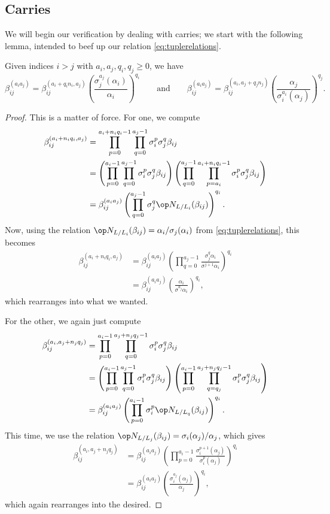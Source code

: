 \documentclass{article}
\numberwithin{equation}{section}
\begin{document}
\subsection{Carries}
We will begin our verification by dealing with carries; we start with the following lemma, intended to beef up our relation \autoref{eq:tuplerelations}.
\begin{lemma}
	Given indices $i>j$ with $a_i,a_j,q_i,q_j\ge0$, we have
	\[\beta_{ij}^{(a_ia_j)}=\beta_{ij}^{(a_i+q_in_i,a_j)}\left(\frac{\sigma_j^{a_j}(\alpha_i)}{\alpha_i}\right)^{q_i}\qquad\text{and}\qquad\beta_{ij}^{(a_ia_j)}=\beta_{ij}^{(a_i,a_j+q_jn_j)}\left(\frac{\alpha_j}{\sigma_i^{a_i}(\alpha_j)}\right)^{q_j}.\]
\end{lemma}
\begin{proof}
	This is a matter of force. For one, we compute
	\begin{align*}
		\beta_{ij}^{(a_i+n_iq_i,a_j)} &= \prod_{p=0}^{a_i+n_iq_i-1}\prod_{q=0}^{a_j-1}\sigma_i^p\sigma_j^q\beta_{ij} \\
		&= \left(\prod_{p=0}^{a_i-1}\prod_{q=0}^{a_j-1}\sigma_i^p\sigma_j^q\beta_{ij}\right)\left(\prod_{q=0}^{a_j-1}\prod_{p=a_i}^{a_i+n_iq_i-1}\sigma_i^p\sigma_j^q\beta_{ij}\right) \\
		&= \beta_{ij}^{(a_ia_j)}\left(\prod_{q=0}^{a_j-1}\sigma_j^q\op N_{L/L_i}(\beta_{ij})\right)^{q_i}.
	\end{align*}
	Now, using the relation $\op N_{L/L_i}(\beta_{ij})=\alpha_i/\sigma_j(\alpha_i)$ from \autoref{eq:tuplerelations}, this becomes
	\begin{align*}
		\beta_{ij}^{(a_i+n_iq_i,a_j)} &= \beta_{ij}^{(a_ia_j)}\left(\prod_{q=0}^{a_j-1}\frac{\sigma_j^q\alpha_i}{\sigma^{j+1}\alpha_i}\right)^{q_i} \\
		&= \beta_{ij}^{(a_ia_j)}\left(\frac{\alpha_i}{\sigma^{a_j}\alpha_i}\right)^{q_i},
	\end{align*}
	which rearranges into what we wanted.

	For the other, we again just compute
	\begin{align*}
		\beta_{ij}^{(a_i,a_j+n_jq_j)} &= \prod_{p=0}^{a_i-1}\prod_{q=0}^{a_j+n_jq_j-1}\sigma_i^p\sigma_j^q\beta_{ij} \\
		&= \left(\prod_{p=0}^{a_i-1}\prod_{q=0}^{a_j-1}\sigma_i^p\sigma_j^q\beta_{ij}\right)\left(\prod_{p=0}^{a_i-1}\prod_{q=q_j}^{a_j+n_jq_j-1}\sigma_i^p\sigma_j^q\beta_{ij}\right) \\
		&= \beta_{ij}^{(a_ia_j)}\left(\prod_{p=0}^{a_i-1}\sigma_i^p\op N_{L/L_q}(\beta_{ij})\right)^{q_i}.
	\end{align*}
	This time, we use the relation $\op N_{L/L_j}(\beta_{ij})=\sigma_i(\alpha_j)/\alpha_j$, which gives
	\begin{align*}
		\beta_{ij}^{(a_i,a_j+n_jq_j)} &= \beta_{ij}^{(a_ia_j)}\left(\prod_{p=0}^{a_i-1}\frac{\sigma_i^{p+1}(\alpha_j)}{\sigma_i^p(\alpha_j)}\right)^{q_i} \\
		&= \beta_{ij}^{(a_ia_j)}\left(\frac{\sigma_i^{a_j}(\alpha_j)}{\alpha_j}\right)^{q_i},
	\end{align*}
	which again rearranges into the desired.
\end{proof}
\end{document}
